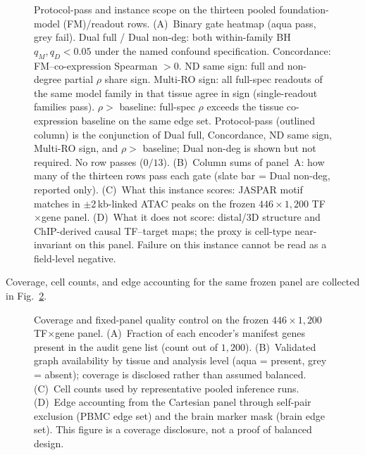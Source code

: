 \documentclass[fleqn,10pt,lineno]{wlpeerj}
\newcommand{\fitfig}[1]{\resizebox{\ifdim\width>\linewidth\linewidth\else\width\fi}{!}{#1}}
\begin{document}
\begin{figure}[!tbp]\centering
\fitfig{}
\caption{Protocol-pass and instance scope on the thirteen pooled foundation-model (FM)/readout
rows. (A)~Binary gate heatmap (aqua pass, grey fail). Dual full / Dual non-deg: both within-family
BH $q_M,q_D<0.05$ under the named confound specification. Concordance: FM--co-expression Spearman
$>0$. ND same sign: full and non-degree partial $\rho$ share sign. Multi-RO sign: all full-spec
readouts of the same model family in that tissue agree in sign (single-readout families pass).
$\rho>$ baseline: full-spec $\rho$ exceeds the tissue co-expression baseline on the same edge set.
Protocol-pass (outlined column) is the conjunction of Dual full, Concordance, ND same sign,
Multi-RO sign, and $\rho>$ baseline; Dual non-deg is shown but not required. No row passes
($0/13$). (B)~Column sums of panel~A: how many of the thirteen rows pass each gate (slate bar =
Dual non-deg, reported only). (C)~What this instance scores: JASPAR motif matches in
$\pm$2\,kb-linked ATAC peaks on the frozen $446\times 1{,}200$ TF$\times$gene panel. (D)~What it
does not score: distal/3D structure and ChIP-derived causal TF--target maps; the proxy is cell-type
near-invariant on this panel. Failure on this instance cannot be read as a field-level
negative.}\label{fig:protocol}
\end{figure}

Coverage, cell counts, and edge accounting for the same frozen panel are collected in
Fig.~\ref{fig:coverage}.

\begin{figure}[!tbp]\centering
\fitfig{}
\caption{Coverage and fixed-panel quality control on the frozen $446\times 1{,}200$ TF$\times$gene
panel. (A)~Fraction of each encoder's manifest genes present in the audit gene list (count out of
$1{,}200$). (B)~Validated graph availability by tissue and analysis level (aqua = present, grey =
absent); coverage is disclosed rather than assumed balanced. (C)~Cell counts used by
representative pooled inference runs. (D)~Edge accounting from the Cartesian panel through
self-pair exclusion (PBMC edge set) and the brain marker mask (brain edge set). This figure is a
coverage disclosure, not a proof of balanced design.}\label{fig:coverage}
\end{figure}
\end{document}
